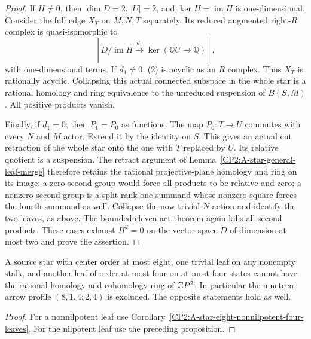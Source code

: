 \begin{proof}
If $H\ne0$, then $\dim D=2$, $|U|=2$, and
$\ker H=\operatorname{im}H$ is one-dimensional. Consider
the full edge $X_T$ on $M,N,T$ separately. Its reduced
augmented right-$R$ complex is quasi-isomorphic to
\[
 [D/\operatorname{im}H\xrightarrow{\overline d_1}
           \ker(\mathbb QU\to\mathbb Q)],                  \tag{2}
\]
with one-dimensional terms. If $\overline d_1\ne0$, (2)
is acyclic as an $R$ complex. Thus $X_T$ is rationally
acyclic. Collapsing this actual connected subspace in
the whole star is a rational homology and ring equivalence
to the unreduced suspension of $B(S,M)$. All positive
products vanish.

Finally, if $\overline d_1=0$, then $P_1=P_0$ as functions.
The map $P_0:T\to U$ commutes with every $N$ and $M$
actor. Extend it by the identity on $S$. This gives an
actual cut retraction of the whole star onto the one with
$T$ replaced by $U$. Its relative quotient is a suspension.
The retract argument of
Lemma~\ref{CP2:A-star-general-leaf-merge} therefore retains
the rational projective-plane homology and ring on its
image: a zero second group would force all products to
be relative and zero; a nonzero second group is a split
rank-one summand whose nonzero square forces the fourth
summand as well. Collapse the now trivial $N$ action and
identify the two leaves, as above. The bounded-eleven act
theorem again kills all second products. These cases
exhaust $H^2=0$ on the vector space $D$ of dimension at
most two and prove the assertion.
\end{proof}

\begin{corollary}
\label{CP2:A-star-eight-four-state-four-leaf}
A source star with center order at most eight, one trivial
leaf on any nonempty stalk, and another leaf of order at
most four on at most four states cannot have the rational
homology and cohomology ring of $\mathbb{C}P^2$.
In particular the nineteen-arrow profile $(8,1,4;2,4)$
is excluded. The opposite statements hold as well.
\end{corollary}
\begin{proof}
For a nonnilpotent leaf use
Corollary~\ref{CP2:A-star-eight-nonnilpotent-four-leaves}.
For the nilpotent leaf use the preceding proposition.
\end{proof}
